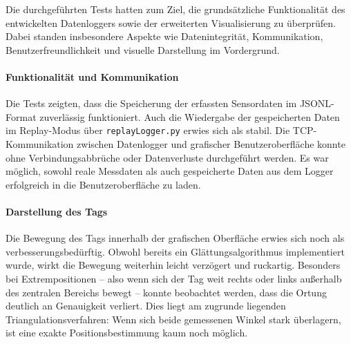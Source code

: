 \documentclass[a4paper, 12pt]{article} %
\begin{document}
Die durchgeführten Tests hatten zum Ziel, die grundsätzliche Funktionalität des entwickelten Datenloggers sowie der erweiterten Visualisierung zu 
überprüfen. Dabei standen insbesondere Aspekte wie Datenintegrität, Kommunikation, Benutzerfreundlichkeit und visuelle Darstellung im Vordergrund.

\paragraph{Funktionalität und Kommunikation}
Die Tests zeigten, dass die Speicherung der erfassten Sensordaten im \ac{JSONL}-Format zuverlässig funktioniert. Auch die Wiedergabe der gespeicherten Daten 
im Replay-Modus über \texttt{replayLogger.py} erwies sich als stabil. Die TCP-Kommunikation zwischen Datenlogger und grafischer Benutzeroberfläche konnte 
ohne Verbindungsabbrüche oder Datenverluste durchgeführt werden. Es war möglich, sowohl reale Messdaten als auch gespeicherte Daten aus dem Logger 
erfolgreich in die Benutzeroberfläche zu laden.

\paragraph{Darstellung des Tags}
Die Bewegung des Tags innerhalb der grafischen Oberfläche erwies sich noch als verbesserungsbedürftig. Obwohl bereits ein Glättungsalgorithmus 
implementiert wurde, wirkt die Bewegung weiterhin leicht verzögert und ruckartig. Besonders bei Extrempositionen – also wenn sich der Tag weit 
rechts oder links außerhalb des zentralen Bereichs bewegt – konnte beobachtet werden, dass die Ortung deutlich an Genauigkeit verliert. Dies liegt
 am zugrunde liegenden Triangulationsverfahren: Wenn sich beide gemessenen Winkel stark überlagern, ist eine exakte Positionsbestimmung kaum noch 
 möglich.
\end{document}

